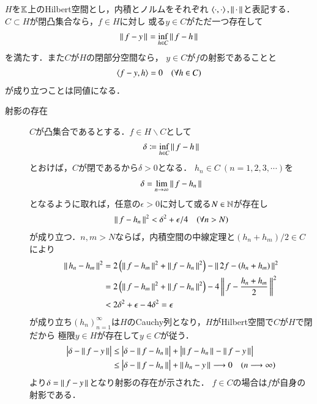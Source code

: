 \begin{itembox}[l]{}
	\begin{thm}[射影定理]
		$H$を$\mathbb{K}$上のHilbert空間とし，内積とノルムをそれぞれ
		$\inprod<\cdot,\cdot>,\Norm{\cdot}{}$と表記する．
		$C \subset H$が閉凸集合なら，$f \in H$に対し
		或る$y \in C$がただ一つ存在して
		\begin{align}
			\left\|\, f - y\, \right\|_{} = \operatorname*{inf}_{h \in C} \left\|\, f - h\, \right\|_{}
		\end{align}
		を満たす．また$C$が$H$の閉部分空間なら，
		$y \in C$が$f$の射影であることと
		\begin{align}
			\inprod<f-y,h> = 0 \quad (\forall h \in C)
		\end{align}
		が成り立つことは同値になる．
	\end{thm}
\end{itembox}
\begin{prf}\mbox{}
	\begin{description}
	\item[射影の存在]
	$C$が凸集合であるとする．$f \in H \backslash C$として
	\begin{align}
		\delta \coloneqq \operatorname*{inf}_{h \in C} \left\|\, f - h\, \right\|_{}
	\end{align}
	とおけば，$C$が閉であるから$\delta > 0$となる．
	$h_n \in C\ (n = 1,2,3,\cdots)$を
	\begin{align}
		\delta = \lim_{n \to \infty}\left\|\, f - h_n\, \right\|_{}
	\end{align}
	となるように取れば，任意の$\epsilon > 0$に対して或る$N \in \mathbb{N}$が存在し
	\begin{align}
		\left\|\, f - h_n\, \right\|_{}^2 < \delta^2 + \epsilon/4 \quad (\forall n > N)
	\end{align}
	が成り立つ．$n,m > N$ならば，内積空間の中線定理と$(h_n + h_m)/2 \in C$により
	\begin{align}
		\left\|\, h_n - h_m\, \right\|_{}^2 &= 2\left( \left\|\, f - h_m\, \right\|_{}^2 + \left\|\, f - h_n\, \right\|_{}^2 \right) - \left\|\, 2f - (h_n + h_m)\, \right\|_{}^2 \\
		&= 2\left( \left\|\, f - h_m\, \right\|_{}^2 + \left\|\, f - h_n\, \right\|_{}^2 \right) - 4\left\|\, f - \frac{h_n + h_m}{2}\, \right\|_{}^2 \\
		&< 2\delta^2 + \epsilon - 4\delta^2 = \epsilon
	\end{align}
	が成り立ち$(h_n)_{n=1}^{\infty}$は$H$のCauchy列となり，$H$がHilbert空間で$C$が$H$で閉だから
	極限$y \in H$が存在して$y \in C$が従う．
	\begin{align}
		\left| \delta - \left\|\, f - y\, \right\|_{} \right| 
		&\leq \left| \delta - \left\|\, f - h_n\, \right\|_{} \right| + \left| \left\|\, f - h_n\, \right\|_{} - \left\|\, f - y\, \right\|_{} \right| \\
		&\leq \left| \delta - \left\|\, f - h_n\, \right\|_{} \right| + \left\|\, h_n - y\, \right\|_{}
		\longrightarrow 0 \quad (n \longrightarrow \infty)
	\end{align}
	より$\delta = \left\|\, f - y\, \right\|_{}$となり射影の存在が示された．
	$f \in C$の場合は$f$が自身の射影である．


\end{description}
\end{prf}
